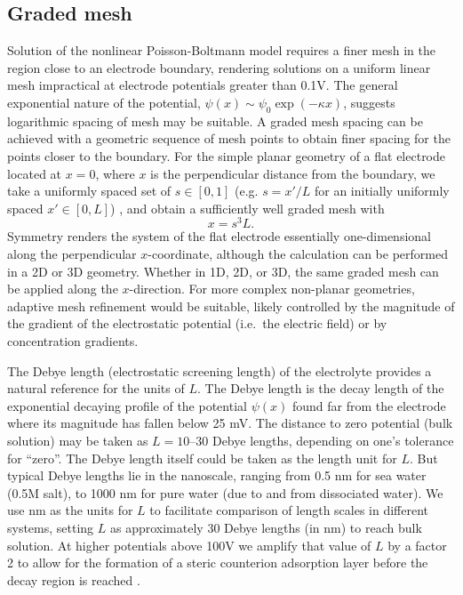 \subsection{Graded mesh}
Solution of the nonlinear Poisson-Boltmann model requires a finer mesh in the  region
close to an electrode boundary, rendering solutions on a uniform linear mesh  impractical at electrode
potentials greater than 0.1V.  The general exponential nature of the potential,
$\psi(x) \sim \psi_{0} \exp(-\kappa x)$, suggests logarithmic spacing of
mesh may be suitable.
A graded mesh spacing can be achieved with a geometric sequence of
mesh points  to obtain finer spacing for the points closer to the boundary.
For the simple planar geometry of a flat electrode located at $x=0$,
where $x$ is the perpendicular distance from the boundary,
we take a uniformly spaced set of $s \in [0,1]$  (e.g. $s=x'/L$ for an
initially uniformly spaced $x'\in [0,L]$) , and obtain a sufficiently
well graded mesh with
\begin{equation}
  x = s^3 L.
\end{equation}
Symmetry renders the system of the flat electrode essentially one-dimensional along the
perpendicular $x$-coordinate, although the calculation can be performed in a 2D
or 3D geometry. Whether in 1D, 2D, or 3D, the same graded mesh can be
applied  along the  $x$-direction.
For more complex non-planar geometries, adaptive mesh refinement would
be suitable, likely controlled by the magnitude of the gradient of the
electrostatic potential (i.e.\ the electric field) or by concentration
gradients.

The Debye length (electrostatic screening length) of the electrolyte
provides a natural reference for the units of $L$. The Debye length is
the  decay length of the exponential decaying profile of the potential $\psi(x)$
found far from the electrode where its magnitude has fallen below 25
mV. The distance to zero potential (bulk solution) may be taken as
$L=10$--30 Debye lengths, depending on one's tolerance for
``zero''. The Debye length itself could be taken as the length unit
for $L$. But typical Debye lengths lie in the nanoscale, ranging from 0.5 nm for
sea water (0.5M salt), to 1000 nm for pure water (due to  and
 from dissociated water). We use nm as the units for $L$ to facilitate
comparison of length scales in different systems, setting $L$ as
approximately 30 Debye lengths (in nm) to reach bulk solution. At
higher potentials above
100V we amplify that value of $L$ by a factor 2 to allow for the formation of a steric counterion adsorption
layer before the decay region is reached \cite{DagmawiParsons2022}.

